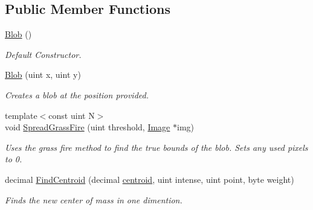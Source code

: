 \subsection*{Public Member Functions}
\begin{DoxyCompactItemize}
\item 
\hyperlink{classimage__processing_1_1Blob_a28446a1a7d8e24aa3f17c1fd4030a216}{Blob} ()
\begin{DoxyCompactList}\small\item\em Default Constructor. \end{DoxyCompactList}\item 
\hyperlink{classimage__processing_1_1Blob_aa1388b1af488ef5151e33db83ba0f395}{Blob} (uint x, uint y)
\begin{DoxyCompactList}\small\item\em Creates a blob at the position provided. \end{DoxyCompactList}\item 
{\footnotesize template$<$const uint N$>$ }\\void \hyperlink{classimage__processing_1_1Blob_ae51f78c334cd1c1fe415c2a989a7f5bd}{Spread\+Grass\+Fire} (uint threshold, \hyperlink{classimage__processing_1_1Image}{Image} $\ast$img)
\begin{DoxyCompactList}\small\item\em Uses the grass fire method to find the true bounds of the blob. Sets any used pixels to 0. \end{DoxyCompactList}\item 
decimal \hyperlink{classimage__processing_1_1Blob_a37368a3984c61551a6b866d3a49abff3}{Find\+Centroid} (decimal \hyperlink{classimage__processing_1_1Blob_a99da260a75ef943f09711bfefa37ab4e}{centroid}, uint intense, uint point, byte weight)
\begin{DoxyCompactList}\small\item\em Finds the new center of mass in one dimention. \end{DoxyCompactList}\end{DoxyCompactItemize}

